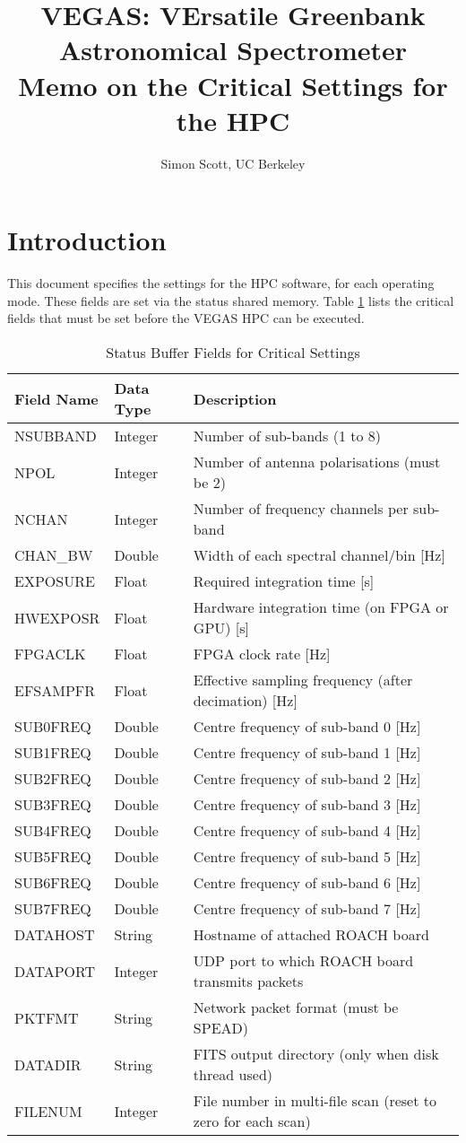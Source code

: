 \documentclass[11pt]{article} %
\title{VEGAS: VErsatile Greenbank Astronomical Spectrometer \\ \Large Memo on the Critical Settings for the HPC}
\author{Simon Scott, UC Berkeley}
\begin{document}
\maketitle
\parskip 7.2pt

\section{Introduction}

This document specifies the settings for the HPC software, for each operating mode. These fields are set via the status shared memory. Table \ref{status-buffer-critical} lists the critical fields that must be set before the VEGAS HPC can be executed.

\begin{table}[!h]
\centering
\caption{Status Buffer Fields for Critical Settings}
\begin{tabular}{l l l}
\hline
\bf Field Name & \bf Data Type & \bf Description \\
\hline
NSUBBAND & Integer & Number of sub-bands (1 to 8) \\
NPOL & Integer & Number of antenna polarisations (must be 2) \\
NCHAN & Integer &  Number of frequency channels per sub-band \\
CHAN\_BW & Double & Width of each spectral channel/bin [Hz]\\
EXPOSURE & Float & Required integration time [s] \\
HWEXPOSR & Float & Hardware integration time (on FPGA or GPU) [s]\\
FPGACLK & Float & FPGA clock rate [Hz] \\
EFSAMPFR & Float & Effective sampling frequency (after decimation) [Hz] \\
SUB0FREQ & Double & Centre frequency of sub-band 0 [Hz] \\
SUB1FREQ & Double & Centre frequency of sub-band 1 [Hz] \\
SUB2FREQ & Double & Centre frequency of sub-band 2 [Hz] \\
SUB3FREQ & Double & Centre frequency of sub-band 3 [Hz] \\
SUB4FREQ & Double & Centre frequency of sub-band 4 [Hz] \\
SUB5FREQ & Double & Centre frequency of sub-band 5 [Hz] \\
SUB6FREQ & Double & Centre frequency of sub-band 6 [Hz] \\
SUB7FREQ & Double & Centre frequency of sub-band 7 [Hz] \\
DATAHOST & String & Hostname of attached ROACH board \\
DATAPORT & Integer & UDP port to which ROACH board transmits packets \\
PKTFMT & String &  Network packet format (must be SPEAD) \\
DATADIR & String & FITS output directory (only when disk thread used) \\
FILENUM & Integer & File number in multi-file scan (reset to zero for each scan) \\
\hline
\end{tabular}
\label{status-buffer-critical}
\end{table}
\end{document}
